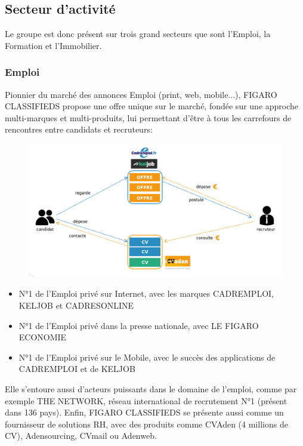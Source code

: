 \subsection{Secteur d'activité}
Le groupe est donc présent sur trois grand secteurs que sont l’Emploi, la Formation et l’Immobilier.
\subsubsection{Emploi}
Pionnier du marché des annonces Emploi (print, web, mobile...), FIGARO CLASSIFIEDS propose une offre unique sur le marché, fondée sur une approche multi-marques et multi-produits, lui permettant d'être à tous les carrefours de rencontres entre candidats et recruteurs:
\begin{figure}[b]
  \begin{center}
    \hspace*{-1in}
    \includegraphics[width=1.25\textwidth]{Pictures/EmploiFCMS.png}
  \end{center}
\end{figure}
\begin{itemize}
  \item N°1 de l'Emploi privé sur Internet, avec les marques CADREMPLOI, KELJOB et CADRESONLINE
  \item N°1 de l'Emploi privé dans la presse nationale, avec LE FIGARO ECONOMIE
  \item N°1 de l'Emploi privé sur le Mobile, avec le succès des applications de CADREMPLOI et de KELJOB
\end{itemize}
Elle s'entoure aussi d'acteurs puissants dans le domaine de l'emploi, comme par exemple THE NETWORK, réseau international de recrutement N°1 (présent dans 136 pays).
Enfin, FIGARO CLASSIFIEDS se présente aussi comme un fournisseur de solutions RH, avec des produits comme CVAden (4 millions de CV), Adensourcing, CVmail ou Adenweb.
